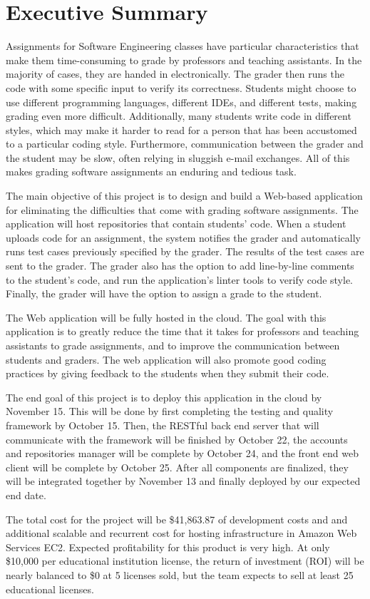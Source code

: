 \part*{Executive Summary}

Assignments for Software Engineering classes have particular characteristics
that make them time-consuming to grade by professors and teaching assistants. In
the majority of cases, they are handed in electronically. The grader then runs
the code with some specific input to verify its correctness. Students might
choose to use different programming languages, different IDEs, and different
tests, making grading even more difficult. Additionally, many students write
code in different styles, which may make it harder to read for a person that has
been accustomed to a particular coding style. Furthermore, communication between
the grader and the student may be slow, often relying in sluggish e-mail
exchanges. All of this makes grading software assignments an enduring and
tedious task.

The main objective of this project is to design and build a Web-based
application  for eliminating the difficulties that come with grading software
assignments. The application will host repositories that contain students' code.
When a student uploads code for an assignment, the system notifies the grader
and automatically runs test cases previously specified by the grader. The
results of the test cases are sent to the grader. The grader also has the option
to add line-by-line comments to the student's code, and run the application's
linter tools to verify code style. Finally, the grader will have the option to
assign a grade to the student.

The Web application will be fully hosted in the cloud. The goal with this
application is to greatly reduce the time that it takes for professors and
teaching assistants to grade assignments, and to improve the communication
between students and graders. The web application will also promote good coding
practices by giving feedback to the students when they submit their code.

The end goal of this project is to deploy this application in the cloud by
November 15. This will be done by first completing the testing and quality
framework by October 15. Then, the RESTful back end server that will communicate
with the framework will be finished by October 22, the accounts and repositories
manager will be complete by October 24, and the front end web client will be
complete by October 25. After all components are finalized, they will be
integrated together by November 13 and finally deployed by our expected end
date.


The total cost for the project will be \$41,863.87 of development costs and
and additional scalable and recurrent cost for hosting infrastructure in
Amazon Web Services EC2. Expected profitability for this product is very high.
At only \$10,000 per educational institution license, the return of investment
(ROI) will be nearly balanced to \$0 at 5 licenses sold, but the team expects
to sell at least 25 educational licenses.
